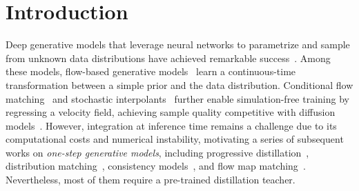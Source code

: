 \section{Introduction}
\label{sec: introduction}

Deep generative models that leverage neural networks to parametrize and sample from unknown data distributions have achieved remarkable success~\cite{ho2020denoising,song2021scorebased,karras2022elucidating,dhariwal2021diffusion,esser2024scaling}. Among these models, flow-based generative models~\cite{chen2018neural,rezende2015variational,dinh2017density,grathwohl2019ffjord,lipman2023flowmatchinggenerativemodeling,tong2024improvinggeneralizingflowbasedgenerative,albergo2023buildingnormalizingflowsstochastic} learn a continuous-time transformation between a simple prior and the data distribution. Conditional flow matching~\cite{lipman2023flowmatchinggenerativemodeling,tong2024improvinggeneralizingflowbasedgenerative} and stochastic interpolants~\cite{albergo2023buildingnormalizingflowsstochastic,albergo2025stochasticinterpolants} further enable simulation-free training by regressing a velocity field, achieving sample quality competitive with diffusion models~\cite{ho2020denoising,song2019generative,song2021scorebased}. However, integration at inference time remains a challenge due to its computational costs and numerical instability, motivating a series of subsequent works on \emph{one-step generative models}, including progressive distillation~\cite{salimans2022progressivedistillationfastsampling}, distribution matching~\cite{yin2024distributionmatchingdistillation,yin2024improveddistributionmatchingdistillation}, consistency models~\cite{song2023consistencymodels,lu2025simplifyingstabilizingscalingcontinuoustime}, and flow map matching~\cite{boffi2025flowmapmatchingstochastic}. Nevertheless, most of them require a pre-trained distillation teacher.

